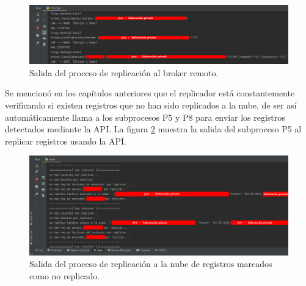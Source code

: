 \begin{figure}[htpb]
\centering 
\includegraphics[width=1.0\textwidth]{./Figures/test/replicador/enviabroker.png}
\caption{Salida del proceso de replicación al broker remoto.}
\label{fig:envia2}
\end{figure}

Se mencionó en los capítulos anteriores que el replicador está constantemente verificando si existen registros que no han sido replicados a la nube, de ser así automáticamente llama a los subprocesos P5 y P8 para enviar los registros detectados mediante la API. La figura \ref{fig:r2} muestra la salida del subproceso P5 al replicar registros usando la API.



\begin{figure}[htpb]
\centering 
\includegraphics[width=1.0\textwidth]{./Figures/test/replicador/sinReplicar2.png}
\caption{Salida del proceso de replicación a la nube de registros marcados como no replicado.}
\label{fig:r2}
\end{figure}


